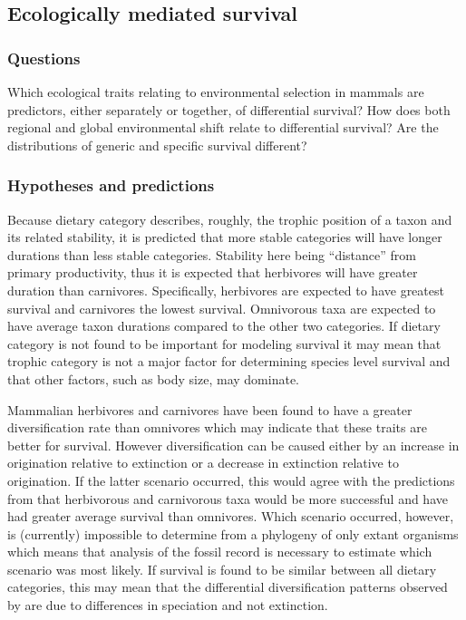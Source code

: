 \documentclass[12pt,letterpaper]{article}
\begin{document}
\subsection{Ecologically mediated survival} \label{sec:mamsurv}
\subsubsection{Questions} \label{sec:mamsurvques}
Which ecological traits relating to environmental selection in mammals are predictors, either separately or together, of differential survival? How does both regional and global environmental shift relate to differential survival? Are the distributions of generic and specific survival different? 

\subsubsection{Hypotheses and predictions} \label{sec:mamsurvback}
Because dietary category describes, roughly, the trophic position of a taxon and its related stability, it is predicted that more stable categories will have longer durations than less stable categories. Stability here being ``distance'' from primary productivity, thus it is expected that herbivores will have greater duration than carnivores. Specifically, herbivores are expected to have greatest survival and carnivores the lowest survival. Omnivorous taxa are expected to have average taxon durations compared to the other two categories. If dietary category is not found to be important for modeling survival it may mean that trophic category is not a major factor for determining species level survival and that other factors, such as body size, may dominate. 

Mammalian herbivores and carnivores have been found to have a greater diversification rate than omnivores \citep{Price2012} which may indicate that these traits are better for survival. However diversification can be caused either by an increase in origination relative to extinction or a decrease in extinction relative to origination. If the latter scenario occurred, this would agree with the predictions from \citet{Price2012} that herbivorous and carnivorous taxa would be more successful and have had greater average survival than omnivores. Which scenario occurred, however, is (currently) impossible to determine from a phylogeny of only extant organisms \citep{Rabosky2010a} which means that analysis of the fossil record is necessary to estimate which scenario was most likely. If survival is found to be similar between all dietary categories, this may mean that the differential diversification patterns observed by \citet{Price2012} are due to differences in speciation and not extinction.
\end{document}
